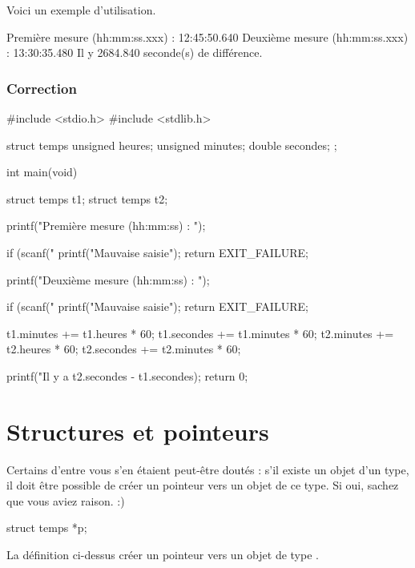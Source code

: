 Voici un exemple d'utilisation.

\begin{C}
Première mesure (hh:mm:ss.xxx) : 12:45:50.640
Deuxième mesure (hh:mm:ss.xxx) : 13:30:35.480
Il y 2684.840 seconde(s) de différence.
\end{C}

\subsubsection{Correction}
\label{correction-15}

\begin{C}
#include <stdio.h>
#include <stdlib.h>

struct temps {
    unsigned heures;
    unsigned minutes;
    double secondes;
};



int main(void)
{
    struct temps t1;
    struct temps t2;

    printf("Première mesure (hh:mm:ss) : ");

    if (scanf("%
    {
        printf("Mauvaise saisie\n");
        return EXIT_FAILURE;
    }

    printf("Deuxième mesure (hh:mm:ss) : ");

    if (scanf("%
    {
        printf("Mauvaise saisie\n");
        return EXIT_FAILURE;
    }

    t1.minutes += t1.heures * 60;
    t1.secondes += t1.minutes * 60;
    t2.minutes += t2.heures * 60;
    t2.secondes += t2.minutes * 60;

    printf("Il y a %
    t2.secondes - t1.secondes);
    return 0;
}
\end{C}

\section{Structures et pointeurs}
\label{structures-et-pointeurs}

Certains d'entre vous s'en étaient peut-être doutés : s'il existe un 
objet d'un type, il doit être possible de créer un pointeur vers un
objet de ce type. Si oui, sachez que vous aviez raison. :)

\begin{C}
struct temps *p;
\end{C}

La définition ci-dessus créer un pointeur  vers un objet de
type .

